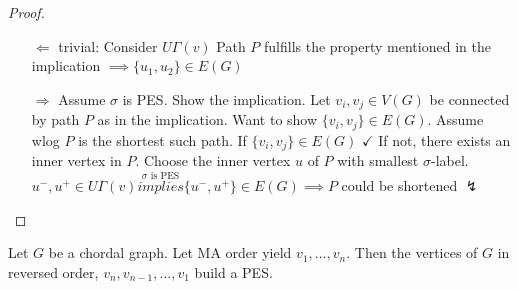 \documentclass[aagt.tex]{subfiles}
\begin{document}
\begin{proof}
  \begin{enumerate}
    \item[$\Leftarrow$] trivial: Consider $U\Gamma(v)$
    Path $P$ fulfills the property mentioned in the implication $\implies \{u_1,u_2\} \in E(G)$
    \item[$\Rightarrow$] Assume $\sigma$ is PES. Show the implication.
    Let $v_i,v_j \in V(G)$ be connected by path $P$ as in the implication. Want to show $\{v_i,v_j\} \in E(G)$.
    Assume wlog $P$ is the shortest such path.
    If $\{v_i,v_j\} \in E(G)$ $\checkmark$
    If not, there exists an inner vertex in $P$. Choose the inner vertex $u$ of $P$ with smallest $\sigma$-label.
    $u^-,u^+ \in U\Gamma(v) \overset{\sigma \text{ is PES}}{implies} \{u^-,u^+\} \in E(G) \implies P$ could be shortened $\lightning$ 
  \end{enumerate}
\end{proof}

\begin{prop}[6.11]
  Let $G$ be a chordal graph. Let MA order yield $v_1,\dots,v_n$.
  Then the vertices of $G$ in reversed order,
  $v_n,v_{n-1},\dots,v_1$ build a PES.
\end{prop}
\end{document}
